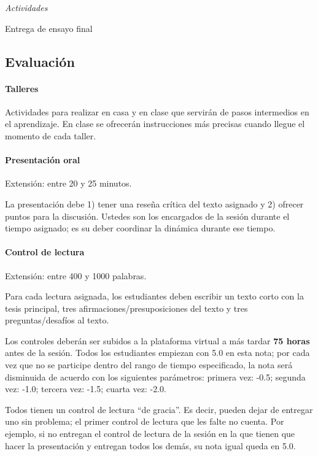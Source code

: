 \documentclass[spanish,]{article}
\let\oldparagraph\paragraph
\renewcommand{\paragraph}[1]{\oldparagraph{#1}\mbox{}}
\begin{document}
\emph{Actividades}

Entrega de ensayo final

\subsection{Evaluación}\label{evaluacion}

\paragraph{\texorpdfstring{\textbf{Talleres}}{Talleres}}\label{talleres}

Actividades para realizar en casa y en clase que servirán de pasos
intermedios en el aprendizaje. En clase se ofrecerán instrucciones más
precisas cuando llegue el momento de cada taller.

\paragraph{\texorpdfstring{\textbf{Presentación
oral}}{Presentación oral}}\label{presentacion-oral}

Extensión: entre 20 y 25 minutos.

La presentación debe 1) tener una reseña crítica del texto asignado y 2)
ofrecer puntos para la discusión. Ustedes son los encargados de la
sesión durante el tiempo asignado; es su deber coordinar la dinámica
durante ese tiempo.

\paragraph{\texorpdfstring{\textbf{Control de
lectura}}{Control de lectura}}\label{control-de-lectura}

Extensión: entre 400 y 1000 palabras.

Para cada lectura asignada, los estudiantes deben escribir un texto
corto con la tesis principal, tres afirmaciones/presuposiciones del
texto y tres preguntas/desafíos al texto.

Los controles deberán ser subidos a la plataforma virtual a más tardar
\textbf{75 horas} antes de la sesión. Todos los estudiantes empiezan con
5.0 en esta nota; por cada vez que no se participe dentro del rango de
tiempo especificado, la nota será disminuida de acuerdo con los
siguientes parámetros: primera vez: -0.5; segunda vez: -1.0; tercera
vez: -1.5; cuarta vez: -2.0.

Todos tienen un control de lectura ``de gracia''. Es decir, pueden dejar
de entregar uno sin problema; el primer control de lectura que les falte
no cuenta. Por ejemplo, si no entregan el control de lectura de la
sesión en la que tienen que hacer la presentación y entregan todos los
demás, su nota igual queda en 5.0.
\end{document}
